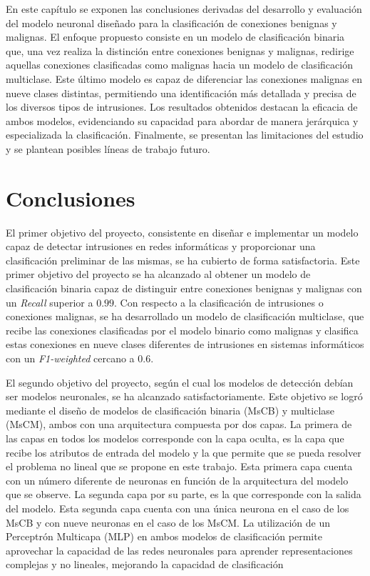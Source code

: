 
En este capítulo se exponen las conclusiones derivadas del desarrollo y evaluación del modelo neuronal diseñado para la clasificación de conexiones benignas y malignas. El enfoque propuesto consiste en un modelo de clasificación binaria que, una vez realiza la distinción entre conexiones benignas y malignas, redirige aquellas conexiones clasificadas como malignas hacia un modelo de clasificación multiclase. Este último modelo es capaz de diferenciar las conexiones malignas en nueve clases distintas, permitiendo una identificación más detallada y precisa de los diversos tipos de intrusiones. Los resultados obtenidos destacan la eficacia de ambos modelos, evidenciando su capacidad para abordar de manera jerárquica y especializada la clasificación. Finalmente, se presentan las limitaciones del estudio y se plantean posibles líneas de trabajo futuro.

\section{Conclusiones}

El primer objetivo del proyecto, consistente en diseñar e implementar un modelo capaz de detectar intrusiones en redes informáticas y proporcionar una clasificación preliminar de las mismas, se ha cubierto de forma satisfactoria. Este primer objetivo del proyecto se ha alcanzado al obtener un modelo de clasificación binaria capaz de distinguir entre conexiones benignas y malignas con un \textit{Recall} superior a $0.99$. Con respecto a la clasificación de intrusiones o conexiones malignas, se ha desarrollado un modelo de clasificación multiclase, que recibe las conexiones clasificadas por el modelo binario como malignas y clasifica estas conexiones en nueve clases diferentes de intrusiones en sistemas informáticos con un \textit{F1-weighted} cercano a $0.6$.

El segundo objetivo del proyecto, según el cual los modelos de detección debían ser modelos neuronales, se ha alcanzado satisfactoriamente. Este objetivo se logró mediante el diseño de modelos de clasificación binaria (MsCB) y multiclase (MsCM), ambos con una arquitectura compuesta por dos capas. La primera de las capas en todos los modelos corresponde con la capa oculta, es la capa que recibe los atributos de entrada del modelo y la que permite que se pueda resolver el problema no lineal que se propone en este trabajo. Esta primera capa cuenta con un número diferente de neuronas en función de la arquitectura del modelo que se observe. La segunda capa por su parte, es la que corresponde con la salida del modelo. Esta segunda capa cuenta con una única neurona en el caso de los MsCB y con nueve neuronas en el caso de los MsCM.  La utilización de un Perceptrón Multicapa (MLP) en ambos modelos de clasificación permite aprovechar la capacidad de las redes neuronales para aprender representaciones complejas y no lineales, mejorando la capacidad de clasificación

